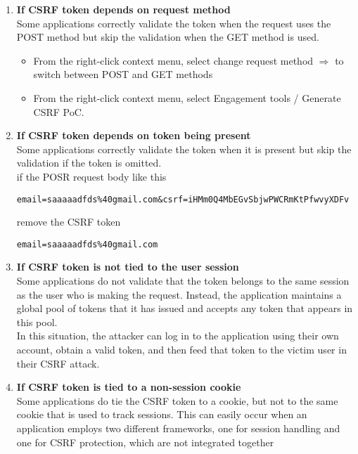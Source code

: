 \documentclass{article}
\begin{document}
\begin{enumerate}
	\item \textbf{If CSRF token depends on request method}\\
	Some applications correctly validate the token when the request uses the POST method but skip the validation when the GET method is used. 
	\begin{itemize}
    \item From the right-click context menu, select change request method $\Longrightarrow$ to switch between POST and GET methods
    \item From the right-click context menu, select Engagement tools / Generate CSRF PoC.
\end{itemize}
	\item \textbf{If CSRF token depends on token being present}\\
	Some applications correctly validate the token when it is present but skip the validation if the token is omitted.\\
	if the POSR request body like this
	        \begin{lstlisting}[frame=single]
email=saaaaadfds%40gmail.com&csrf=iHMm0Q4MbEGvSbjwPWCRmKtPfwvyXDFv
            \end{lstlisting}
            
            remove the CSRF token 
            	\begin{lstlisting}[frame=single]
	            email=saaaaadfds%40gmail.com
            \end{lstlisting}
            
     \item \textbf{If CSRF token is not tied to the user session}\\
	 Some applications do not validate that the token belongs to the same session as the user who is making the request. Instead, the application maintains a global pool of tokens that it has issued and accepts any token that appears in this pool.\\
	 
In this situation, the attacker can log in to the application using their own account, obtain a valid token, and then feed that token to the victim user in their CSRF attack.

	\item \textbf{If CSRF token is tied to a non-session cookie}\\
	Some applications do tie the CSRF token to a cookie, but not to the same cookie that is used to track sessions. This can easily occur when an application employs two different frameworks, one for session handling and one for CSRF protection, which are not integrated together


\end{enumerate}
\end{document}
